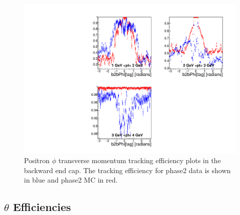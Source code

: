 \documentclass[a4paper,11pt,twosided,final,german,openbib,pdftex,listof=totoc,bibliography=totoc]{scrbook}
\begin{document}
\begin{figure}[!htbp]
	\centering
	\includegraphics[width=\textwidth]{Plots/master/xPtMPhiepEC}
	\caption[Transverse Momentum $\phi$ Positron backward end cap Efficiency Phase2]{Positron $\phi$ transverse momentum tracking efficiency plots in the backward end cap. The tracking efficiency for phase2 data is shown in blue and phase2 MC in red.}
\end{figure}

\newpage











\subsection{$\theta$ Efficiencies}
\end{document}
